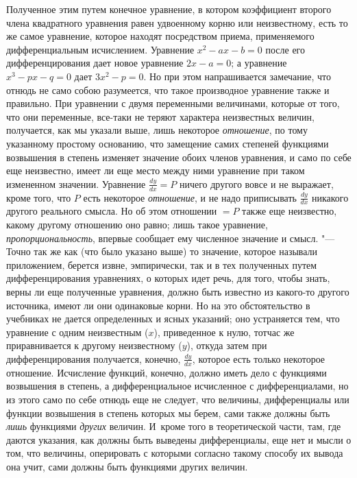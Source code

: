 Полученное этим путем конечное уравнение, в котором коэффициент второго члена
квадратного уравнения равен удвоенному корню или неизвестному, есть то же самое
уравнение, которое находят посредством приема, применяемого дифференциальным
исчислением. Уравнение $x^2-ax-b=0$ после его дифференцирования дает новое
уравнение $2x-a=0$; а уравнение $x^3-px-q=0$ дает $3x^2-p=0$. Но при этом
напрашивается замечание, что отнюдь не само собою разумеется, что такое
производное уравнение также и правильно. При уравнении с двумя переменными
величинами, которые от того, что они переменные, все-таки не теряют характера
неизвестных величин, получается, как мы указали выше, лишь некоторое
{\em отношение}, по тому указанному простому основанию, что замещение самих
степеней функциями возвышения в степень изменяет значение обоих членов
уравнения, и само по себе еще неизвестно, имеет ли еще место между ними
уравнение при таком измененном значении. Уравнение $\frac{dy}{dx}=P$ ничего
другого вовсе и не выражает, кроме того, что $P$ есть некоторое
{\em отношение}, и не надо приписывать $\frac{dy}{dx}$ никакого другого
реального смысла. Но об этом отношении $=P$ также еще неизвестно, какому
другому отношению оно равно; лишь такое уравнение, {\em пропорциональность},
впервые сообщает ему численное значение и смысл. "--- Точно так же как (что
было указано выше) то значение, которое называли приложением, берется извне,
эмпирически, так и в тех полученных путем дифференцирования уравнениях, о
которых идет речь, для того, чтобы знать, верны ли еще полученные уравнения,
должно быть известно из какого-то другого источника, имеют ли они одинаковые
корни. Но на это обстоятельство в учебниках не дается определенных и ясных
указаний; оно устраняется тем, что уравнение с одним неизвестным ($x$),
приведенное к нулю, тотчас же приравнивается к другому неизвестному ($y$),
откуда затем при дифференцирования получается, конечно, $\frac{dy}{dx}$,
которое есть только некоторое отношение. Исчисление функций, конечно, должно
иметь дело с функциями возвышения в степень, а дифференциальное исчисленное с
дифференциалами, но из этого само по себе отнюдь еще не следует, что величины,
дифференциалы или функции возвышения в степень которых мы берем, сами также
должны быть {\em лишь} функциями {\em других} величин. И~кроме того в
теоретической части, там, где даются указания, как должны быть выведены
дифференциалы, еще нет и мысли о том, что величины, оперировать с которыми
согласно такому способу их вывода она учит, сами должны быть функциями других
величин.

